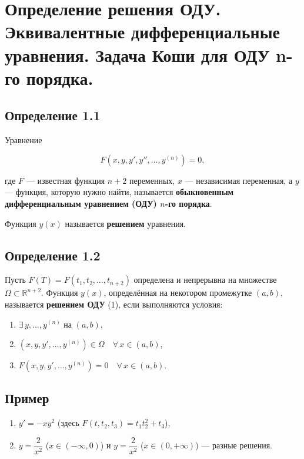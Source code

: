{
	\section{Определение решения ОДУ. Эквивалентные дифференциальные уравнения. Задача Коши для ОДУ n-го порядка.}
	\subsection*{Определение 1.1}

	Уравнение


	\[
	F(x, y, y', y'', \ldots, y^{(n)}) = 0,
	\]


	где \( F \) — известная функция \( n + 2 \) переменных, \( x \) — независимая переменная, а \( y \) — функция, которую нужно найти, называется \textbf{обыкновенным дифференциальным уравнением (ОДУ) \( n \)-го порядка}.

	Функция \( y(x) \) называется \textbf{решением} уравнения.

	\subsection*{Определение 1.2}

	Пусть \( F(T) = F(t_1, t_2, \ldots, t_{n+2}) \) определена и непрерывна на множестве \( \Omega \subset \mathbb{R}^{n+2} \). Функция \( y(x) \), определённая на некотором промежутке \( (a, b) \), называется \textbf{решением ОДУ} (1), если выполняются условия:
	\begin{enumerate}
		\item $\exists\, y, \ldots, y^{(n)}$ на $(a, b),$
    	\item $(x, y, y', \ldots, y^{(n)}) \in \Omega \quad \forall\, x \in (a, b),$
    	\item $F(x, y, y', \ldots, y^{(n)}) = 0 \quad \forall\, x \in (a, b).$
	\end{enumerate}

	\subsection*{Пример}

	\begin{enumerate}
		\item $y' = -x y^2$ \quad (здесь $F(t, t_2, t_3) = t_1 t_2^2 + t_3$),
		\item $y = \dfrac{2}{x^2}$ \quad ($x \in (-\infty, 0)$) и $y = \dfrac{2}{x^2}$ \quad ($x \in (0, +\infty)$) — разные решения.
	\end{enumerate}



}
